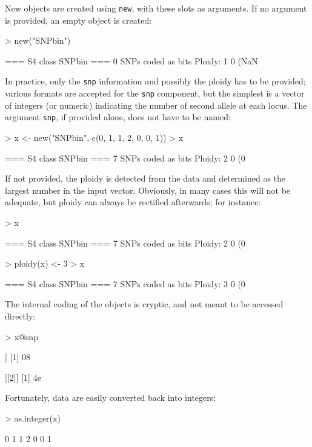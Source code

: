 \documentclass{article}
\begin{document}
New objects are created using \texttt{new}, with these slots as arguments.
If no argument is provided, an empty object is created:
\begin{Schunk}
\begin{Sinput}
> new("SNPbin")
\end{Sinput}
\begin{Soutput}
 === S4 class SNPbin ===
 0 SNPs coded as bits
 Ploidy: 1
 0 (NaN %
\end{Soutput}
\end{Schunk}
In practice, only the \texttt{snp} information and possibly the ploidy has to be provided; various
formats are accepted for the \texttt{snp} component, but the simplest is a vector of integers (or
numeric) indicating the number of second allele at each locus.
The argument \texttt{snp}, if provided alone, does not have to be named:
\begin{Schunk}
\begin{Sinput}
> x <- new("SNPbin", c(0, 1, 1, 2, 0, 0, 1))
> x
\end{Sinput}
\begin{Soutput}
 === S4 class SNPbin ===
 7 SNPs coded as bits
 Ploidy: 2
 0 (0 %
\end{Soutput}
\end{Schunk}

If not provided, the ploidy is detected from the data and determined as the largest number in the
input vector. Obviously, in many cases this will not be adequate, but ploidy can always be rectified
afterwards; for instance:
\begin{Schunk}
\begin{Sinput}
> x
\end{Sinput}
\begin{Soutput}
 === S4 class SNPbin ===
 7 SNPs coded as bits
 Ploidy: 2
 0 (0 %
\end{Soutput}
\begin{Sinput}
> ploidy(x) <- 3
> x
\end{Sinput}
\begin{Soutput}
 === S4 class SNPbin ===
 7 SNPs coded as bits
 Ploidy: 3
 0 (0 %
\end{Soutput}
\end{Schunk}

\noindent The internal coding of the objects is cryptic, and not meant to be accessed directly:
\begin{Schunk}
\begin{Sinput}
> x@snp
\end{Sinput}
\begin{Soutput}
[[1]]
[1] 08

[[2]]
[1] 4e
\end{Soutput}
\end{Schunk}
Fortunately, data are easily converted back into integers:
\begin{Schunk}
\begin{Sinput}
> as.integer(x)
\end{Sinput}
\begin{Soutput}
[1] 0 1 1 2 0 0 1
\end{Soutput}
\end{Schunk}
\end{document}
